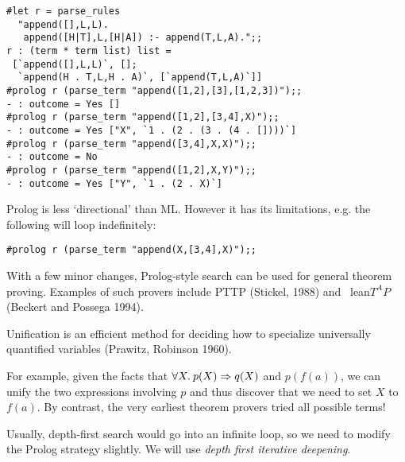 \begin{slide*}


\vspace*{0.5cm}

\begin{black}\begin{footnotesize}\begin{verbatim}
#let r = parse_rules
  "append([],L,L).
   append([H|T],L,[H|A]) :- append(T,L,A).";;
r : (term * term list) list =
 [`append([],L,L)`, [];
  `append(H . T,L,H . A)`, [`append(T,L,A)`]]
#prolog r (parse_term "append([1,2],[3],[1,2,3])");;
- : outcome = Yes []
#prolog r (parse_term "append([1,2],[3,4],X)");;
- : outcome = Yes ["X", `1 . (2 . (3 . (4 . [])))`]
#prolog r (parse_term "append([3,4],X,X)");;
- : outcome = No
#prolog r (parse_term "append([1,2],X,Y)");;
- : outcome = Yes ["Y", `1 . (2 . X)`]
\end{verbatim}\end{footnotesize}\end{black}

Prolog is less `directional' than ML. However it has its limitations, e.g.
the following will loop indefinitely:

\begin{black}\begin{footnotesize}\begin{verbatim}
#prolog r (parse_term "append(X,[3,4],X)");;
\end{verbatim}\end{footnotesize}\end{black}

\end{slide*}



\begin{slide*}


\vspace*{0.5cm}

With a few minor changes, Prolog-style search can be used for general theorem
proving. Examples of such provers include PTTP (Stickel, 1988) and \mbox{{\sf
lean}$T^{\!\!\textstyle A}\!\!P$} (Beckert and Possega 1994).

Unification is an efficient method for deciding how to specialize universally
quantified variables (Prawitz, Robinson 1960).

For example, given the facts that {\red $\forall X.\: p(X) \Rightarrow q(X)$} and {\red
$p(f(a))$}, we can unify the two expressions involving {\red $p$} and thus
discover that we need to set {\red $X$} to {\red $f(a)$}. By contrast, the very
earliest theorem provers tried all possible terms!

Usually, depth-first search would go into an infinite loop, so we need to
modify the Prolog strategy slightly. We will use {\em depth first iterative
deepening}.

\end{slide*}



